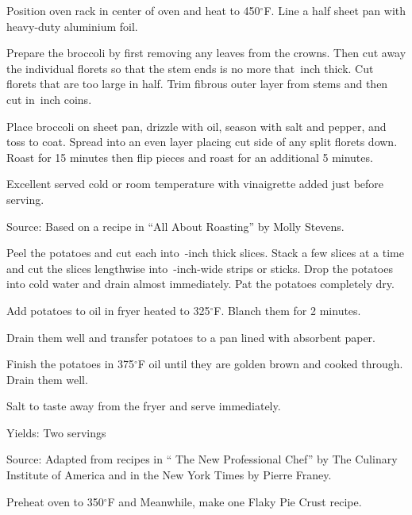 \documentclass[letterpaper]{recipePMG}
\renewcommand{\deg}{$^\circ$}
\newcommand{\quarter}{\nicefrac{1}{4} \,}
\newcommand{\half}{\nicefrac{1}{2} \,}
\begin{document}
Position oven rack in center of oven and heat to 450\deg F. Line a half sheet pan with heavy-duty aluminium foil.

Prepare the broccoli by first removing any leaves from the crowns. Then cut away the individual florets so that the stem ends is no more that \half inch thick. Cut florets that are too large in half. Trim fibrous outer layer from stems and then cut in \half inch coins.

Place broccoli on sheet pan, drizzle with oil, season with salt and pepper, and toss to coat. Spread into an even layer placing cut side of any split florets down.  Roast for 15 minutes then flip pieces and roast for an additional 5 minutes.

Excellent served cold or room temperature with vinaigrette added just before serving.  

Source: Based on a recipe in ``All About Roasting'' by Molly Stevens.


\newpage
{}
\label{FrenchFriedPotatoes}

Peel the potatoes and cut each into \quarter-inch thick slices. Stack a few slices at a time and cut the slices lengthwise into \quarter-inch-wide strips or sticks.  Drop the potatoes into cold water and drain almost immediately. Pat the potatoes completely dry.

Add potatoes to oil in fryer heated to 325\deg F.  Blanch them for 2 minutes.

Drain them well and transfer potatoes to a pan lined with absorbent paper.

Finish the potatoes in 375\deg F oil until they are golden brown and cooked through. Drain them well.

Salt to taste away from the fryer and serve immediately. 

Yields: Two servings

Source: Adapted from recipes in `` The New Professional Chef'' by The Culinary Institute of America and in the New York Times by Pierre Franey.
\newpage
{}
\label{SpinichCheddarQuiche}


Preheat oven to 350\deg F and Meanwhile, make one Flaky Pie Crust recipe.
\end{document}
